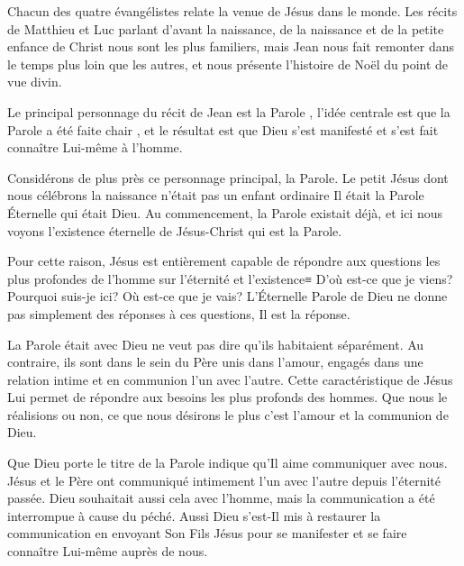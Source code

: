 

Chacun des quatre évangélistes relate la venue de Jésus dans le monde. Les récits de Matthieu et Luc parlant d'avant la naissance, de la naissance et de la petite enfance de Christ nous sont les plus familiers, mais Jean nous fait remonter dans le temps plus loin que les autres, et nous présente l'histoire de Noël du point de vue divin.

Le principal personnage du récit de Jean est \og la Parole \fg{}, l'idée centrale est que \og la Parole a été faite chair \fg{}, et le résultat est que Dieu s'est manifesté et s'est fait connaître Lui-même à l'homme.

Considérons de plus près ce personnage principal, la Parole. Le petit Jésus dont nous célébrons la naissance n'était pas un enfant ordinaire \ocadr Il était la Parole Éternelle qui était Dieu. Au commencement, la Parole existait déjà, et ici nous voyons l'existence éternelle de Jésus-Christ qui est la Parole.

Pour cette raison, Jésus est entièrement capable de répondre aux questions les plus profondes de l'homme sur l'éternité et l'existence≡ D'où est-ce que je viens? Pourquoi suis-je ici? Où est-ce que je vais? L'Éternelle Parole de Dieu ne donne pas simplement des réponses à ces questions, Il est la réponse.

\og La Parole était avec Dieu \fg{} ne veut pas dire qu'ils habitaient séparément. Au contraire, ils sont dans le sein du Père \ocadr unis dans l'amour, engagés dans une relation intime et en communion l'un avec l'autre. Cette caractéristique de Jésus Lui permet de répondre aux besoins les plus profonds des hommes. Que nous le réalisions ou non, ce que nous désirons le plus c'est l'amour et la communion de Dieu.

Que Dieu porte le titre de \og la Parole \fg{} indique qu'Il aime communiquer avec nous. Jésus et le Père ont communiqué intimement l'un avec l'autre depuis l'éternité passée. Dieu souhaitait aussi cela avec l'homme, mais la communication a été interrompue à cause du péché. Aussi Dieu s'est-Il mis à restaurer la communication en envoyant Son Fils Jésus pour se manifester et se faire connaître Lui-même auprès de nous.

